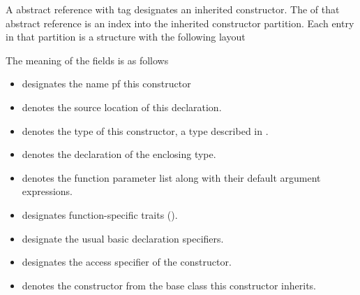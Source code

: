 A  abstract reference with tag 
designates an inherited constructor.  The  of that abstract reference
is an index into the inherited constructor partition.  Each entry in that partition
is a structure with the following layout
%
\begin{figure}[H]
	\centering
\end{figure}
%
The meaning of the fields is as follows
\begin{itemize}
	\item {} designates the name pf this constructor
	\item {} denotes the source location of this declaration.
	\item {} denotes the type of this constructor, a type described in .
	\item {} denotes the declaration of the enclosing type.
	\item {} denotes the function parameter list along with their default argument expressions.
	\item {} designates function-specific traits ().
	\item {} designate the usual basic declaration specifiers.
	\item {} designates the access specifier of the constructor.
	\item {} denotes the constructor from the base class this constructor inherits.
\end{itemize}


\subsection{} 
\label{sec:ifc:DeclSort:Destructor}

